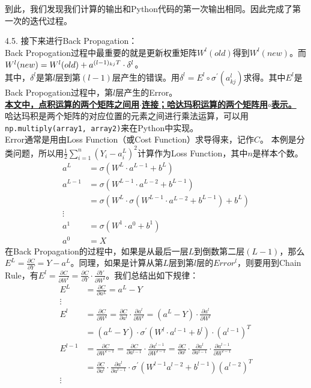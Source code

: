 \documentclass[a4paper,12pt,oneside]{book}
\begin{document}
到此，我们发现我们计算的输出和Python代码的第一次输出相同。因此完成了第一次的迭代过程。

4.5. 接下来进行Back Propagation：\\
Back Propogation过程中最重要的就是更新权重矩阵$W^l(old)$得到$W^l(new)$。而$W^l(new) = W^l(old) + a^{(l-1)_{kj}\space T} \cdot \delta^l$。\\
其中，$\delta^l$是第$l$层到第$(l-1)$层产生的错误。用$\delta^l = E^l \circ \sigma^{'}(a^{l}_{kj})$求得。其中$E^l$是Back Propogation过程中，第$l$层产生的Error。\\
\underline{\textbf{本文中，点积运算的两个矩阵之间用$\cdot$连接；哈达玛积运算的两个矩阵用$\circ$表示。}}\\
哈达玛积是两个矩阵的对应位置的元素之间进行乘法运算，可以用\lstinline{np.multiply(array1, array2)}来在Python中实现。\\
Error通常是用由Loss Function（或Cost Function）求导得来，记作$C$。
本例是分类问题，所以用$\frac{1}{2} \sum_{i=1}^{n}(Y_i-a^L_i)^2$计算作为Loss Function，其中$n$是样本个数。
\begin{equation}
    \begin{split}
        a^L &= \sigma(W^L\cdot a^{L-1}+b^L)\\
        a^{L-1} & = \sigma(W^{L-1} \cdot a^{L-2} + b^{L-1}) \\
        & = \sigma(W^L\cdot \sigma(W^{L-1} \cdot a^{L-2} + b^{L-1}) + b^L)\\
        \vdots \\
        a^1 &= \sigma(W^1 \cdot a^0 + b^1)\\
        a^0 &= X
    \end{split}
\end{equation}
在Back Propagation的过程中，如果是从最后一层$L$到倒数第二层$(L-1)$，那么$E^L=\frac{\partial{C}}{\partial{Y}}=Y-a^L$。同理，如果是计算从第$L$层到第$l$层的$Error^l$，则要用到Chain Rule，有$E^l=\frac{\partial{C}}{\partial{W^l}}=\frac{\partial{C}}{\partial{Y}}\cdot \frac{\partial{Y}}{\partial{W^l}}$。我们总结出如下规律：
\begin{equation}
    \begin{split}
        E^L &= \frac{\partial{C}}{\partial{a^L}}=a^L-Y \\
        \vdots\\
        E^l &= \frac{\partial{C}}{\partial{W^l}} = \frac{\partial{C}}{\partial{a^l}} \cdot \frac{\partial{a^l}}{\partial{W^l}} = (a^L-Y) \cdot \frac{\partial{a^l}}{\partial{W^l}}\\
        &= (a^L-Y) \cdot \sigma^{'}(W^l \cdot a^{l-1}+b^l)\cdot (a^{l-1})^T\\
        E^{l-1} &= \frac{\partial{C}}{\partial{W^{l-1}}} = \frac{\partial{C}}{\partial{a^{l-1}}} \cdot \frac{\partial{a^{l-1}}}{\partial{W^{l-1}}} =\frac{\partial{C}}{\partial{a^l}}\cdot\frac{\partial{a^l}}{\partial{a^{l-1}}}\cdot\frac{\partial{a^{l-1}}}{\partial{W^{l-1}}} \\
        &= \frac{\partial{C}}{\partial{a^l}}\cdot\frac{\partial{a^l}}{\partial{a^{l-1}}}\cdot \sigma^{'}(W^{l-1}a^{l-2}+b^{l-1})(a^{l-2})^T\\
        \vdots \\
   \end{split}
\end{equation}
\end{document}
